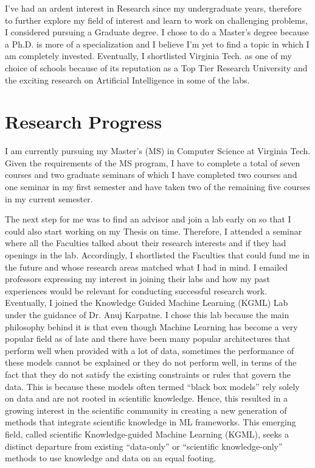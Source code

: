 \documentclass[11pt]{article}
\begin{document}
I've had an ardent interest in Research since my undergraduate years, therefore to further explore my field of interest and learn to work on challenging problems, I considered pursuing a Graduate degree. I chose to do a Master's degree because a Ph.D. is more of a specialization and I believe I'm yet to find a topic in which I am completely invested. Eventually, I shortlisted Virginia Tech. as one of my choice of schools because of its reputation as a Top Tier Research University and the exciting research on Artificial Intelligence in some of the labs.  


\section{Research Progress}

I am currently pursuing my Master's (MS) in Computer Science at Virginia Tech.  Given the requirements of the MS program, I have to complete a total of seven courses and two graduate seminars of which I have completed two courses and one seminar in my first semester and have taken two of the remaining five courses in my current semester. \par
The next step for me was to find an advisor and join a lab early on so that I could also start working on my Thesis on time. Therefore, I attended a seminar where all the Faculties talked about their research interests and if they had openings in the lab. Accordingly, I shortlisted the Faculties that could fund me in the future and whose research areas matched what I had in mind. I emailed professors expressing my interest in joining their labs and how my past experiences would be relevant for conducting successful research work. Eventually, I joined the Knowledge Guided Machine Learning (KGML) Lab under the guidance of Dr. Anuj Karpatne. I chose this lab because the main philosophy behind it is that even though Machine Learning has become a very popular field as of late and there have been many popular architectures that perform well when provided with a lot of data, sometimes the performance of these models cannot be explained or they do not perform well, in terms of the fact that they do not satisfy the existing constraints or rules that govern the data. This is because these models often termed “black box models” rely solely on data and are not rooted in scientific knowledge. Hence, this resulted in a growing interest in the scientific community in creating a new generation of methods that integrate scientific knowledge in ML frameworks. This emerging field, called scientific Knowledge-guided Machine Learning (KGML), seeks a distinct departure from existing “data-only” or “scientific knowledge-only” methods to use knowledge and data on an equal footing. \par
\end{document}
